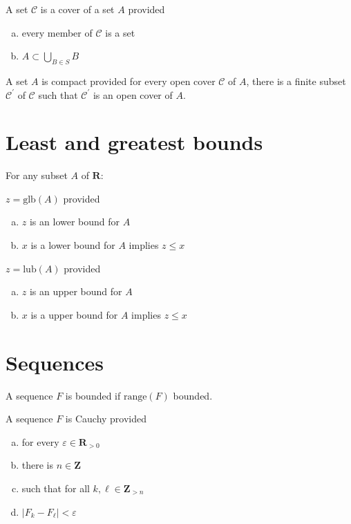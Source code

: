 \documentclass[letterpaper,landscape,9pt,fleqn]{extarticle}
\newcommand{\range}{\mathrm{range}}
\newcommand{\reals}{\mathbf{R}}
\newcommand{\integers}{\mathbf{Z}}
\newcommand{\glb}{\mathrm{glb}}
\newcommand{\lub}{\mathrm{lub}}
\newenvironment{alphalist}{
  \begin{enumerate}[(a)]
    \addtolength{\itemsep}{-1.0\itemsep}}
  {\end{enumerate}}
\begin{document}
\begin{multicols*}{3}
\begin{description}[\itemsep=0em]
    \item[Open cover] A set $\mathcal{C}$ is a cover of a set $A$ provided 
     \begin{alphalist}
         \item every member of $\mathcal{C}$ is a set
         \item $A \subset \underset{B \in S}{\bigcup} B $
     \end{alphalist}

     \item[Compact] A set $A$ is compact provided for every 
     open cover $\mathcal{C}$ of $A$, there is a finite
     subset $\mathcal{C}^\prime$ of $\mathcal{C}$ such that
     $\mathcal{C}^\prime$ is an open cover of $A$.
     
    \end{description} 

\section*{Least and greatest bounds} 
For any subset $A$ of $\reals$:
\begin{description}[\itemsep=0em]
    \item[glb] $z = \glb(A)$ provided
    \begin{alphalist}
        \item $z$ is an lower bound for $A$
        \item $x$ is a lower bound for $A$ implies $z \leq x$
    \end{alphalist}
   \item[lub]  $z = \lub(A)$ provided
   \begin{alphalist}
       \item $z$ is an upper bound for $A$
       \item $x$ is a upper bound for $A$ implies $z \leq x$
   \end{alphalist}
\end{description}   
\section*{Sequences}
\begin{description}[\itemsep=0em]
\item[Bounded] A sequence $F$ is bounded if $\range(F)$ bounded.

\item[Cauchy] A sequence $F$ is Cauchy provided
\begin{alphalist}
    \item for every $\varepsilon \in \reals_{>0}$
    \item there is $n \in \integers$
    \item such that for all $k,\ell \in \integers_{>n}$
    \item $|F_k - F_\ell| < \varepsilon$
\end{alphalist}


\end{description}
\end{multicols*}
\end{document}
